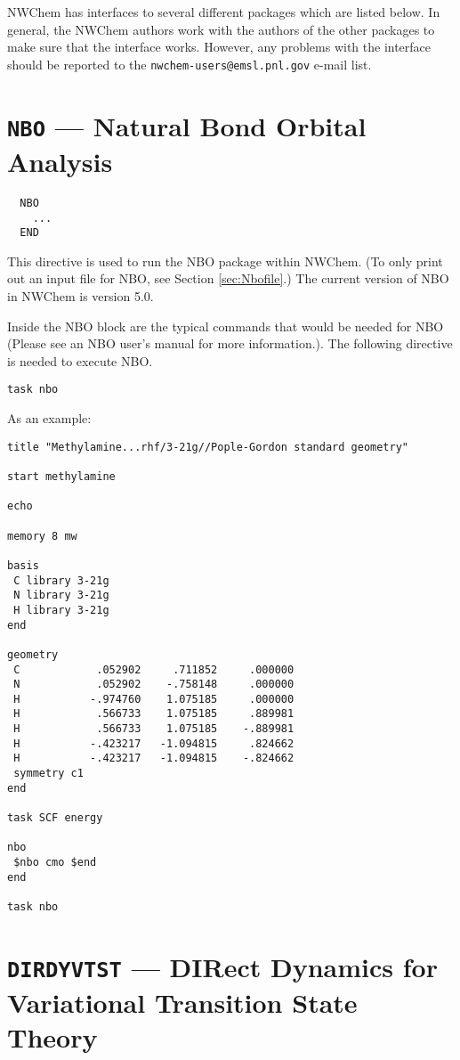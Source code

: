 \label{sec:interface}

NWChem has interfaces to several different packages which are listed below.
In general, the NWChem authors work with the authors of the other packages
to make sure that the interface works.  However, any problems with the 
interface should be reported to the
{\tt nwchem-users@emsl.pnl.gov} e-mail list.

\section{{\tt NBO} --- Natural Bond Orbital Analysis}
\label{sec:nbo}
\begin{verbatim}
  NBO
    ...
  END
\end{verbatim}

This directive is used to run the NBO package within NWChem.  (To only print
out an input file for NBO, see Section \ref{sec:Nbofile}.)  The current
version of NBO in NWChem is version 5.0.

Inside the NBO block are the typical commands that would be needed for NBO
(Please see an NBO user's manual for more information.).  The following
directive is needed to execute NBO.
\begin{verbatim}
task nbo
\end{verbatim}
As an example:

\begin{verbatim}
title "Methylamine...rhf/3-21g//Pople-Gordon standard geometry"

start methylamine

echo

memory 8 mw

basis
 C library 3-21g
 N library 3-21g
 H library 3-21g
end

geometry
 C            .052902     .711852     .000000
 N            .052902    -.758148     .000000
 H           -.974760    1.075185     .000000
 H            .566733    1.075185     .889981
 H            .566733    1.075185    -.889981
 H           -.423217   -1.094815     .824662
 H           -.423217   -1.094815    -.824662
 symmetry c1
end

task SCF energy

nbo
 $nbo cmo $end
end

task nbo 

\end{verbatim}

\section{{\tt DIRDYVTST} --- DIRect Dynamics for Variational Transition State Theory}
\label{sec:dirdyvtst}

